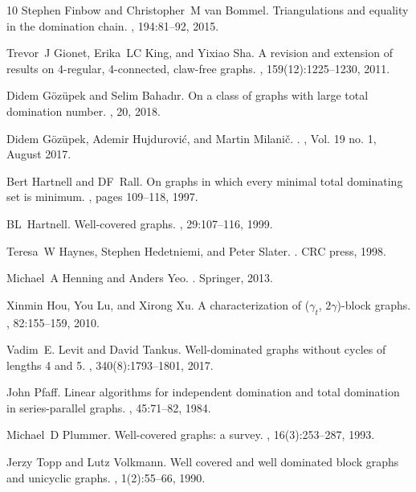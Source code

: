 \documentclass[11pt]{article}
\theoremstyle{definition}
\begin{document}
\begin{thebibliography}{10}
	Stephen Finbow and Christopher~M van Bommel.
	\newblock Triangulations and equality in the domination chain.
	, 194:81--92, 2015.
	
	Trevor~J Gionet, Erika~LC King, and Yixiao Sha.
	\newblock A revision and extension of results on 4-regular, 4-connected,
	claw-free graphs.
	, 159(12):1225--1230, 2011.
	
	Didem G{\"o}z{\"u}pek and Selim Bahad{\i}r.
	\newblock On a class of graphs with large total domination number.
	, 20, 2018.
	
	Didem Gözüpek, Ademir Hujdurović, and Martin Milanič.
	.
	, {Vol.
		19 no. 1}, August 2017.
	
	Bert Hartnell and DF~Rall.
	\newblock On graphs in which every minimal total dominating set is minimum.
	, pages 109--118, 1997.
	
	BL~Hartnell.
	\newblock Well-covered graphs.
	, 29:107--116, 1999.
	
	Teresa~W Haynes, Stephen Hedetniemi, and Peter Slater.
	.
	\newblock CRC press, 1998.
	
	Michael~A Henning and Anders Yeo.
	.
	\newblock Springer, 2013.
	
	Xinmin Hou, You Lu, and Xirong Xu.
	\newblock A characterization of ($\gamma_t$, $2\gamma$)-block graphs.
	, 82:155--159, 2010.
	
	Vadim~E. Levit and David Tankus.
	\newblock Well-dominated graphs without cycles of lengths 4 and 5.
	, 340(8):1793--1801, 2017.
	
	John Pfaff.
	\newblock Linear algorithms for independent domination and total domination in
	series-parallel graphs.
	, 45:71--82, 1984.
	
	Michael~D Plummer.
	\newblock Well-covered graphs: a survey.
	, 16(3):253--287, 1993.
	
	Jerzy Topp and Lutz Volkmann.
	\newblock Well covered and well dominated block graphs and unicyclic graphs.
	, 1(2):55--66, 1990.
	
\end{thebibliography}
\end{document}
